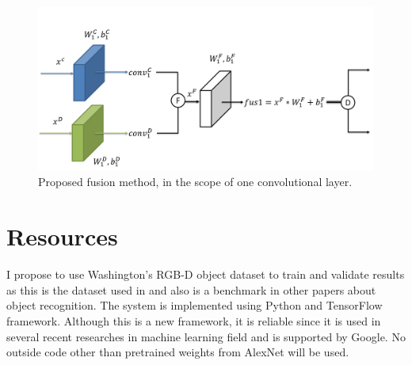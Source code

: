 \documentclass[11pt,letterpaper]{article}
\begin{document}
\begin{figure}
	\centering
	\includegraphics[width=\textwidth]{Picture2}
	\caption{Proposed fusion method, in the scope of one convolutional layer.}
	\label{fig:my_archi}
\end{figure}

\section{Resources}
I propose to use Washington's RGB-D object dataset to train and validate results as this is the dataset used in \cite{DBLP:journals/corr/EitelSSRB15} and also is a benchmark in other papers about object recognition. The system is implemented using Python and TensorFlow framework. Although this is a new framework, it is reliable since it is used in several recent researches in machine learning field and is supported by Google. No outside code other than pretrained weights from AlexNet will be used.



\end{document}
